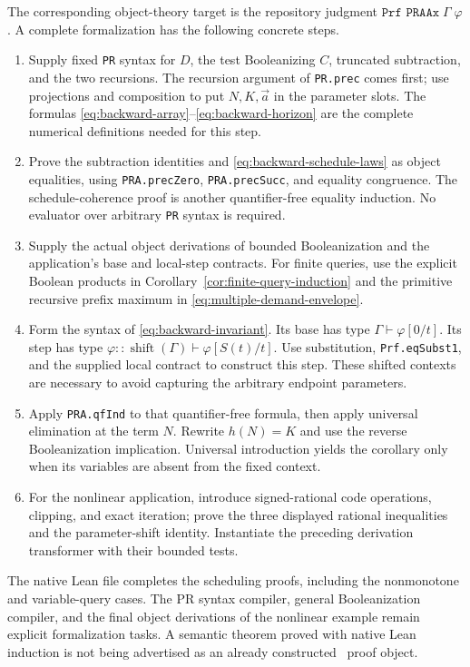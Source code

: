 The corresponding object-theory target is the repository judgment
$\texttt{Prf PRAAx}\;\Gamma\;\varphi$ \cite{repo-core}.
A complete formalization has the following concrete steps.
\begin{enumerate}
\item Supply fixed \texttt{PR} syntax for $D$, the test Booleanizing $C$,
  truncated subtraction, and the two recursions.  The recursion argument
  of \texttt{PR.prec} comes first; use projections and composition to put
  $N,K,\vec a$ in the parameter slots.  The formulas
  \eqref{eq:backward-array}--\eqref{eq:backward-horizon} are the complete
  numerical definitions needed for this step.
\item Prove the subtraction identities and
  \eqref{eq:backward-schedule-laws} as object equalities, using
  \texttt{PRA.precZero}, \texttt{PRA.precSucc}, and equality congruence.
  The schedule-coherence proof is another quantifier-free equality
  induction.  No evaluator over arbitrary \texttt{PR} syntax is required.
\item Supply the actual object derivations of bounded Booleanization and
  the application's base and local-step contracts.  For finite queries,
  use the explicit Boolean products in
  Corollary~\ref{cor:finite-query-induction} and the primitive recursive
  prefix maximum in \eqref{eq:multiple-demand-envelope}.
\item Form the syntax of \eqref{eq:backward-invariant}.  Its base has type
  $\Gamma\vdash\varphi[0/t]$.  Its step has type
  $\varphi::\operatorname{shift}(\Gamma)\vdash\varphi[S(t)/t]$.
  Use substitution, \texttt{Prf.eqSubst1}, and the supplied local contract
  to construct this step.  These shifted contexts are necessary to avoid
  capturing the arbitrary endpoint parameters.
\item Apply \texttt{PRA.qfInd} to that quantifier-free formula, then apply
  universal elimination at the term $N$.  Rewrite $h(N)=K$ and use the
  reverse Booleanization implication.  Universal introduction yields
  the corollary only when its variables are absent from the fixed context.
\item For the nonlinear application, introduce signed-rational code
  operations, clipping, and exact iteration; prove the three displayed
  rational inequalities and the parameter-shift identity.  Instantiate
  the preceding derivation transformer with their bounded tests.
\end{enumerate}
The native Lean file completes the scheduling proofs, including the
nonmonotone and variable-query cases.  The PR syntax compiler, general
Booleanization compiler, and the final object derivations of the nonlinear
example remain explicit formalization tasks.  A semantic theorem proved
with native Lean induction is not being advertised as an already
constructed \ipra\ proof object.

